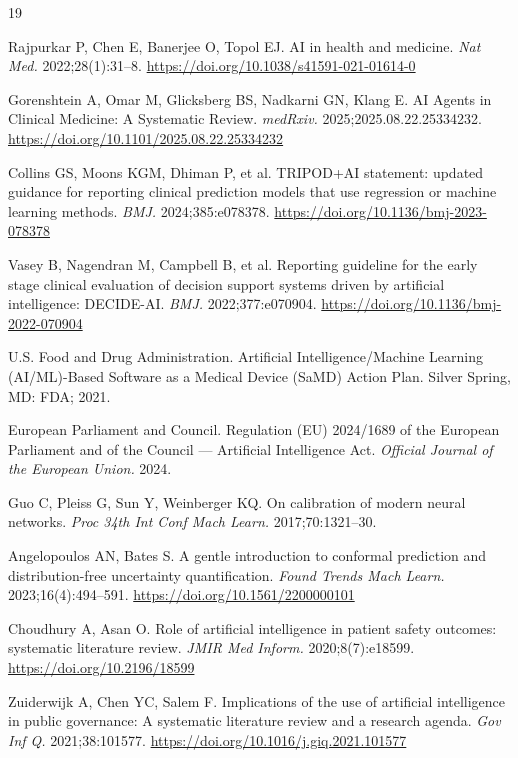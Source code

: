 \documentclass[12pt,a4paper]{article}
\begin{document}
\begin{thebibliography}{19}
\setlength{\itemsep}{4pt}

Rajpurkar P, Chen E, Banerjee O, Topol EJ. AI in health and
medicine. \textit{Nat Med.} 2022;28(1):31--8.
\url{https://doi.org/10.1038/s41591-021-01614-0}

Gorenshtein A, Omar M, Glicksberg BS, Nadkarni GN, Klang E.
AI Agents in Clinical Medicine: A Systematic Review.
\textit{medRxiv.} 2025;2025.08.22.25334232.
\url{https://doi.org/10.1101/2025.08.22.25334232}

Collins GS, Moons KGM, Dhiman P, et al. TRIPOD+AI statement:
updated guidance for reporting clinical prediction models that
use regression or machine learning methods. \textit{BMJ.}
2024;385:e078378.
\url{https://doi.org/10.1136/bmj-2023-078378}

Vasey B, Nagendran M, Campbell B, et al. Reporting guideline
for the early stage clinical evaluation of decision support
systems driven by artificial intelligence: DECIDE-AI.
\textit{BMJ.} 2022;377:e070904.
\url{https://doi.org/10.1136/bmj-2022-070904}

U.S. Food and Drug Administration. Artificial
Intelligence/Machine Learning (AI/ML)-Based Software as a
Medical Device (SaMD) Action Plan. Silver Spring, MD: FDA; 2021.

European Parliament and Council. Regulation (EU) 2024/1689 of
the European Parliament and of the Council --- Artificial
Intelligence Act. \textit{Official Journal of the European
Union.} 2024.

Guo C, Pleiss G, Sun Y, Weinberger KQ. On calibration of
modern neural networks. \textit{Proc 34th Int Conf Mach Learn.}
2017;70:1321--30.

Angelopoulos AN, Bates S. A gentle introduction to conformal
prediction and distribution-free uncertainty quantification.
\textit{Found Trends Mach Learn.} 2023;16(4):494--591.
\url{https://doi.org/10.1561/2200000101}

Choudhury A, Asan O. Role of artificial intelligence in patient
safety outcomes: systematic literature review. \textit{JMIR Med
Inform.} 2020;8(7):e18599.
\url{https://doi.org/10.2196/18599}

Zuiderwijk A, Chen YC, Salem F. Implications of the use of
artificial intelligence in public governance: A systematic
literature review and a research agenda. \textit{Gov Inf Q.}
2021;38:101577.
\url{https://doi.org/10.1016/j.giq.2021.101577}


\end{thebibliography}
\end{document}
